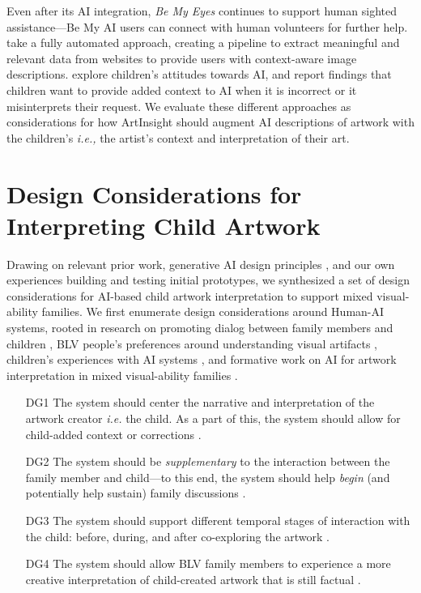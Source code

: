 \documentclass[sigconf]{acmart}
\begin{document}
Even after its AI integration, \textit{Be My Eyes} continues to support human sighted assistance---Be My AI users can connect with human volunteers for further help. \citet{Gubbi_ContextAware} take a fully automated approach, creating a pipeline to extract meaningful and relevant data from websites to provide users with context-aware image descriptions. \citet{darth_vader} explore children's attitudes towards AI, and report findings that children want to provide added context to AI when it is incorrect or it misinterprets their request. We evaluate these different approaches as considerations for how ArtInsight should augment AI descriptions of artwork with the children's \textit{i.e.,} the artist's context and interpretation of their art.

\section{Design Considerations for Interpreting Child Artwork}
\label{DGs}
Drawing on relevant prior work, generative AI design principles \cite{GAI_DesignPrinciples}, and our own experiences building and testing initial prototypes, we synthesized a set of design considerations for AI-based child artwork interpretation to support mixed visual-ability families. We first enumerate design considerations around Human-AI systems, rooted in research on promoting dialog between family members and children \cite{Dietz_ContextQ, Zhang_StoryBuddy}, BLV people's preferences around understanding visual artifacts \cite{Li_UnderstandingVisualArtsExperiences, bennett_itscomplicated}, children's experiences with AI systems \cite{darth_vader}, and formative work on AI for artwork interpretation in mixed visual-ability families \cite{chhedakothary2024}. 

\begin{itemize}
    \item[DG1] The system should center the narrative and interpretation of the artwork creator \textit{i.e.} the child. As a part of this, the system should allow for child-added context or corrections \cite{darth_vader, Li_UnderstandingVisualArtsExperiences, chhedakothary2024, GAI_DesignPrinciples}.
    \item[DG2] The system should be \emph{supplementary} to the interaction between the family member and child---to this end, the system should help \textit{begin} (and potentially help sustain) family discussions \cite{Dietz_ContextQ, Zhang_StoryBuddy}.
    \item[DG3] The system should support different temporal stages of interaction with the child: before, during, and after co-exploring the artwork \cite{Zhang_StoryBuddy, chhedakothary2024}. 
    \item[DG4] The system should allow BLV family members to experience a more creative interpretation of child-created artwork that is still factual \cite{Li_UnderstandingVisualArtsExperiences, chhedakothary2024}.
\end{itemize}
\end{document}
